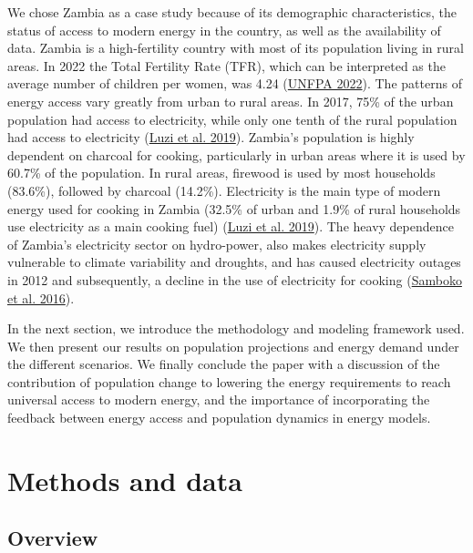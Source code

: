\documentclass[
]{article}
\begin{document}
We chose Zambia as a case study because of its demographic characteristics, the status of access to modern energy in the country, as well as the availability of data. Zambia is a high-fertility country with most of its population living in rural areas. In 2022 the Total Fertility Rate (TFR), which can be interpreted as the average number of children per women, was 4.24 (\protect\hyperlink{ref-unfpa_world_2022}{UNFPA 2022}). The patterns of energy access vary greatly from urban to rural areas. In 2017, 75\% of the urban population had access to electricity, while only one tenth of the rural population had access to electricity (\protect\hyperlink{ref-luzi_zambia_2019}{Luzi et al. 2019}). Zambia's population is highly dependent on charcoal for cooking, particularly in urban areas where it is used by 60.7\% of the population. In rural areas, firewood is used by most households (83.6\%), followed by charcoal (14.2\%). Electricity is the main type of modern energy used for cooking in Zambia (32.5\% of urban and 1.9\% of rural households use electricity as a main cooking fuel) (\protect\hyperlink{ref-luzi_zambia_2019}{Luzi et al. 2019}). The heavy dependence of Zambia's electricity sector on hydro-power, also makes electricity supply vulnerable to climate variability and droughts, and has caused electricity outages in 2012 and subsequently, a decline in the use of electricity for cooking (\protect\hyperlink{ref-samboko_load_2016}{Samboko et al. 2016}).

In the next section, we introduce the methodology and modeling framework used. We then present our results on population projections and energy demand under the different scenarios. We finally conclude the paper with a discussion of the contribution of population change to lowering the energy requirements to reach universal access to modern energy, and the importance of incorporating the feedback between energy access and population dynamics in energy models.

\newpage

\hypertarget{methods-and-data}{%
\section{Methods and data}\label{methods-and-data}}

\hypertarget{overview}{%
\subsection{Overview}\label{overview}}
\end{document}
